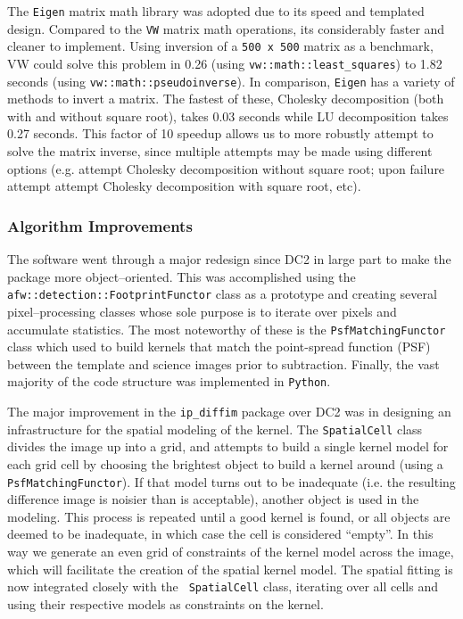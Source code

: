 The {\tt Eigen} matrix math library was adopted due to its speed and
templated design.  Compared to the {\tt VW} matrix math operations,
its considerably faster and cleaner to implement.  Using inversion of
a {\tt 500 x 500} matrix as a benchmark, VW could solve this problem
in 0.26 (using {\tt vw::math::least\_squares}) to 1.82 seconds (using
{\tt vw::math::pseudoinverse}).  In comparison, {\tt Eigen} has a
variety of methods to invert a matrix.  The fastest of these, Cholesky
decomposition (both with and without square root), takes 0.03 seconds
while LU decomposition takes 0.27 seconds.  This factor of 10 speedup
allows us to more robustly attempt to solve the matrix inverse, since
multiple attempts may be made using different options (e.g. attempt
Cholesky decomposition without square root; upon failure attempt
attempt Cholesky decomposition with square root, etc).


\subsubsection{Algorithm Improvements} \label{sec:ImsubImprove}

The software went through a major redesign since DC2 in large part to
make the package more object--oriented.  This was accomplished using
the {\tt afw::detection::FootprintFunctor} class as a prototype and
creating several pixel--processing classes whose sole purpose is to
iterate over pixels and accumulate statistics.  The most noteworthy of
these is the {\tt PsfMatchingFunctor} class which used to build
kernels that match the point-spread function (PSF) between the
template and science images prior to subtraction.  Finally, the vast
majority of the code structure was implemented in {\tt Python}.

The major improvement in the {\tt ip\_diffim} package over DC2 was in
designing an infrastructure for the spatial modeling of the kernel.
The {\tt SpatialCell} class divides the image up into a grid, and
attempts to build a single kernel model for each grid cell by choosing
the brightest object to build a kernel around (using a {\tt
PsfMatchingFunctor}).  If that model turns out to be inadequate
(i.e. the resulting difference image is noisier than is acceptable),
another object is used in the modeling.  This process is repeated
until a good kernel is found, or all objects are deemed to be
inadequate, in which case the cell is considered ``empty''.  In this
way we generate an even grid of constraints of the kernel model across
the image, which will facilitate the creation of the spatial kernel
model.  The spatial fitting is now integrated closely with the {\tt
SpatialCell} class, iterating over all cells and using their
respective models as constraints on the kernel.

